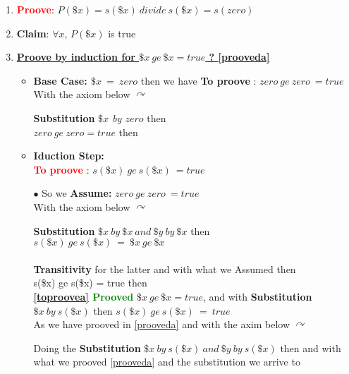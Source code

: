 \begin{enumerate}
\item  \textbf{\textcolor{red}{Proove}}: $P(\$x) = s(\$x)\ divide\ s(\$x) = s(zero)$ \label{theotoproove}
\item \textbf{Claim}: $\forall x $, $P(\$x)$ is true
\item \underline{\textbf{Proove by induction for $\$x\ ge\ \$x = true$\label{toproovea} ? \ref{prooveda} }}\\
\begin{itemize}
\item \textbf{Base Case: $ \$x\ =\ zero $ } then we have \textbf{To proove} : $zero\ ge\ zero\ = true$\\
With the axiom below $\curvearrowright$

\textbf{Substitution} \textit{$\$x$ by $zero$} then\\
$zero\ ge\ zero = true$  then \checkmark\\
\item \textbf{Iduction Step:}\\
\textcolor{red}{\textbf{To proove }} : $s(\$x)\ ge\ s(\$x)\ = true$ \\
\item[$\bullet$] So we \textbf{Assume: }  $zero\ ge\ zero\ = true$ \\
With the axiom below $\curvearrowright$

\textbf{Substitution}
$\$x\ by\  \$x\ \textit{and}\ \$y\  by\  \$x $  then\\
$s(\$x)\ ge\ s(\$x)\ =\ \$x\ ge\ \$x$\\ \\
\textbf{Transitivity} for the latter and with what we Assumed then\\
s(\$x) ge s(\$x) = true  then \checkmark\\
\textbf{\textcolor{green}{\ref{toproovea} Prooved\label{prooveda}}} $\$x\ ge\ \$x = true$\checkmark, and with \textbf{Substitution} $ \$x\ by\ s(\$x) $ then $s(\$x)\ ge\  s(\$x)\ =\ true$ \checkmark\\
\newpage
As we have prooved in \ref{prooveda} and with the axim below $\curvearrowright$

Doing the \textbf{Substitution} $\$x\ by\ s(\$x)\ and\ \$y\ by\ s(\$x) $ then
 and with what we prooved \ref{prooveda} and the substitution we arrive to 

\end{itemize}


\end{enumerate}
